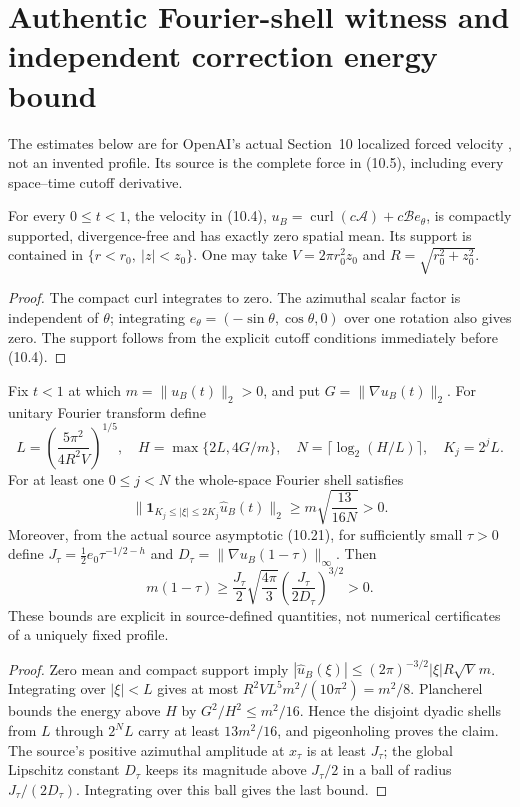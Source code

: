 \section{Authentic Fourier-shell witness and independent correction energy bound}
\label{sec:xxxi-shell}
The estimates below are for OpenAI's actual Section~10 localized forced velocity
\cite{openai2026}, not an invented profile. Its source is the complete
force in (10.5), including every space--time cutoff derivative.

\begin{lemma}
For every $0\le t<1$, the velocity in (10.4),
$u_B=\operatorname{curl}(c\mathcal A)+c\mathcal B e_\theta$,
is compactly supported, divergence-free and has exactly zero spatial mean.
Its support is contained in $\{r<r_0,\ |z|<z_0\}$.
One may take $V=2\pi r_0^2z_0$ and $R=\sqrt{r_0^2+z_0^2}$.
\end{lemma}
\begin{proof}
The compact curl integrates to zero. The azimuthal scalar factor is
independent of $\theta$; integrating $e_\theta=(-\sin\theta,\cos\theta,0)$
over one rotation also gives zero. The support follows from the
explicit cutoff conditions immediately before (10.4).
\end{proof}

\begin{theorem}
Fix $t<1$ at which $m=\|u_B(t)\|_2>0$, and put
$G=\|\nabla u_B(t)\|_2$. For unitary Fourier transform define
\[
L=\left(\frac{5\pi^2}{4R^2V}\right)^{1/5},\quad
H=\max\{2L,4G/m\},\quad N=\lceil\log_2(H/L)\rceil,\quad K_j=2^jL.
\]
For at least one $0\le j<N$ the whole-space Fourier shell satisfies
\begin{equation}\label{eq:xxxi-lower}
\boxed{\quad \|\mathbf1_{K_j\le|\xi|\le2K_j}\widehat u_B(t)\|_2
\ge m\sqrt{\frac{13}{16N}}>0.\quad}
\end{equation}
Moreover, from the actual source asymptotic (10.21), for sufficiently
small $\tau>0$ define $J_\tau=\frac12e_0\tau^{-1/2-h}$ and
$D_\tau=\|\nabla u_B(1-\tau)\|_\infty$. Then
\begin{equation}\label{eq:xxxi-source-mass}
\boxed{\quad
m(1-\tau)\ge\frac{J_\tau}{2}\sqrt{\frac{4\pi}{3}}
\left(\frac{J_\tau}{2D_\tau}\right)^{3/2}>0.\quad}
\end{equation}
These bounds are explicit in source-defined quantities, not numerical
certificates of a uniquely fixed profile.
\end{theorem}
\begin{proof}
Zero mean and compact support imply
$|\widehat u_B(\xi)|\le(2\pi)^{-3/2}|\xi|R\sqrt V\,m$.
Integrating over $|\xi|<L$ gives at most
$R^2VL^5m^2/(10\pi^2)=m^2/8$.
Plancherel bounds the energy above $H$ by $G^2/H^2\le m^2/16$.
Hence the disjoint dyadic shells from $L$ through $2^NL$ carry at
least $13m^2/16$, and pigeonholing proves the claim.
The source's positive azimuthal amplitude at $x_\tau$ is at least
$J_\tau$; the global Lipschitz constant $D_\tau$ keeps its
magnitude above $J_\tau/2$ in a ball of radius
$J_\tau/(2D_\tau)$. Integrating over this ball gives the last bound.
\end{proof}

